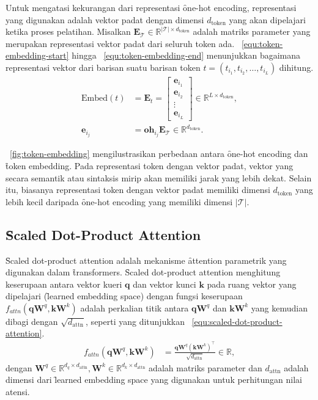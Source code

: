 	Untuk mengatasi kekurangan dari representasi \f{one-hot encoding}, representasi yang digunakan adalah vektor padat dengan dimensi $d_{\text{token}}$ yang akan dipelajari ketika proses pelatihan. Misalkan $\mathbf{E}_{\mathcal{T}} \in \mathbb{R}^{|\mathcal{T}| \times d_{\text{token}}}$ adalah matriks parameter yang merupakan representasi vektor padat dari seluruh token ada. \equ~\ref{equ:token-embedding-start} hingga \equ~\ref{equ:token-embedding-end} menunjukkan bagaimana representasi vektor dari barisan suatu barisan token $t = (t_{i_1}, t_{i_2}, \dots, t_{i_L})$ dihitung.
	\begin{align}
		\label{equ:token-embedding-start}
		\text{Embed}(t) &= \mathbf{E}_{t} = \begin{bmatrix}
			\mathbf{e}_{i_1} \\
			\mathbf{e}_{i_2} \\
			\vdots \\
			\mathbf{e}_{i_L}
		\end{bmatrix} \in \mathbb{R}^{L \times d_{\text{token}}}, \\
		\mathbf{e}_{i_j} &= \mathbf{oh}_{i_j} \mathbf{E}_{\mathcal{T}} \in \mathbb{R}^{d_{\text{token}}}.
		\label{equ:token-embedding-end}
	\end{align}

	\pic~\ref{fig:token-embedding} mengilustrasikan perbedaan antara \f{one-hot encoding} dan \f{token embedding}. Pada representasi token dengan vektor padat, vektor yang secara semantik atau sintaksis mirip akan memiliki jarak yang lebih dekat. Selain itu, biasanya representasi token dengan vektor padat memiliki dimensi $d_{\text{token}}$ yang lebih kecil daripada \f{one-hot encoding} yang memiliki dimensi $|\mathcal{T}|$.

	\subsection{\f{Scaled Dot-Product Attention}}
	\label{sec:scaled-dot-product-attention}

	\f{Scaled dot-product attention} adalah mekanisme \f{attention} parametrik yang digunakan dalam \f{transformers}. \f{Scaled dot-product attention} menghitung keserupaan antara vektor kueri $\mathbf{q}$ dan vektor kunci $\mathbf{k}$ pada ruang vektor yang dipelajari (\f{learned embedding space}) dengan fungsi keserupaan $f_{attn}(\mathbf{q} \mathbf{W}^q, \mathbf{k}\mathbf{W}^k) $ adalah perkalian titik antara $\mathbf{qW}^q$ dan $\mathbf{kW}^k$ yang kemudian dibagi dengan $\sqrt{d_{\text{attn}}}$, seperti yang ditunjukkan \equ~\ref{equ:scaled-dot-product-attention}.
	\begin{align}
		\label{equ:scaled-dot-product-attention}
		f_{attn}(\mathbf{q} \mathbf{W}^q, \mathbf{k} \mathbf{W}^k) &= \frac{\mathbf{q} \mathbf{W}^q (\mathbf{k} \mathbf{W}^k)^{\top}}{\sqrt{d_{\text{attn}}}} \in \mathbb{R},
	\end{align}
	dengan $\mathbf{W}^q \in \mathbb{R}^{d_q \times d_{\text{attn}}}, \mathbf{W}^k \in \mathbb{R}^{d_k \times d_{\text{attn}}}$ adalah matriks parameter dan $d_{\text{attn}}$ adalah dimensi dari \f{learned embedding space} yang digunakan untuk perhitungan nilai atensi. 

